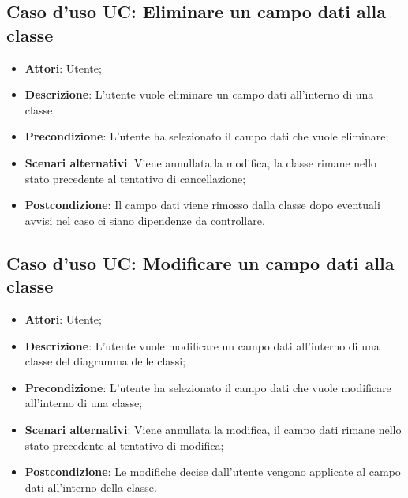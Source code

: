 \documentclass[../AnalisiDeiRequisiti.tex]{subfiles}
\begin{document}
			\subsection{Caso d'uso UC: Eliminare un campo dati alla classe}
			\begin{itemize}
				\item \textbf{Attori}: Utente;
				
				\item \textbf{Descrizione}: L'utente vuole eliminare un campo dati all'interno di una classe;
				
				\item \textbf{Precondizione}: L'utente ha selezionato il campo dati che vuole eliminare;
				
				\item \textbf{Scenari alternativi}: Viene annullata la modifica, la classe
				rimane nello stato precedente al tentativo di cancellazione;
				
				
				\item \textbf{Postcondizione}: Il campo dati viene rimosso dalla classe dopo eventuali avvisi nel caso ci siano dipendenze da controllare.
			\end{itemize}
			
			\subsection{Caso d'uso UC: Modificare un campo dati alla classe}
			\begin{itemize}
				\item \textbf{Attori}: Utente;
				
				\item \textbf{Descrizione}: L'utente vuole modificare un campo dati all'interno di una classe del diagramma delle classi;
				
				\item \textbf{Precondizione}: L'utente ha selezionato il campo dati che vuole modificare all'interno di una classe;
				
				\item \textbf{Scenari alternativi}: Viene annullata la modifica, il campo dati
				rimane nello stato precedente al tentativo di modifica;
				
				\item \textbf{Postcondizione}: Le modifiche decise dall'utente vengono applicate al campo dati all'interno della classe.
			\end{itemize}
			
\end{document}
